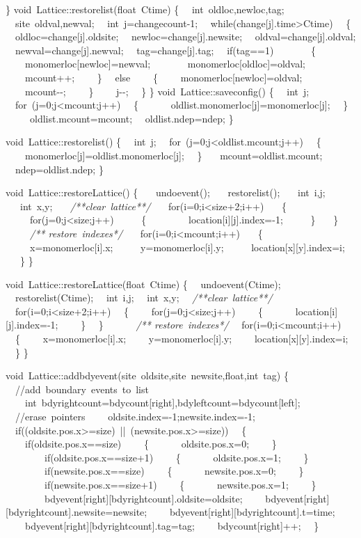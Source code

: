 {\}
void\ Lattice::restorelist(float\ Ctime)
\{
\ \ int\ oldloc,newloc,tag;
\ \ site\ oldval,newval;
\ \ int\ j=changecount-{}1;
\ \ while(change[j].time>{}Ctime)
\ \ \{
\ \ oldloc=change[j].oldsite;
\ \ newloc=change[j].newsite;
\ \ oldval=change[j].oldval;
\ \ newval=change[j].newval;
\ \ tag=change[j].tag;
\ \ if(tag==1)
\ \ \ \ \ \ \ \{
\ \ \ \ monomerloc[newloc]=newval;
\ \ \ \ \ \ \ monomerloc[oldloc]=oldval;
\ \ \ \ mcount++;
\ \ \ \ \}
\ \ else
\ \ \ \ \{
\ \ \ \ monomerloc[newloc]=oldval;
\ \ \ \ mcount-{}-{};
\ \ \ \ \}
\ \ \ \ j-{}-{};
\ \ \}
\}
void\ Lattice::saveconfig()
\{
\ \ int\ j;
\ \ for\ (j=0;j<{}mcount;j++)
\ \ \{
\ \ \ \ \ \ oldlist.monomerloc[j]=monomerloc[j];
\ \ \}
\ \ \
\ \ oldlist.mcount=mcount;
\ \ oldlist.ndep=ndep;
\}

void\ Lattice::restorelist()
\{
\ \ int\ j;
\ \ for\ (j=0;j<{}oldlist.mcount;j++)
\ \ \{
\ \ \ \ monomerloc[j]=oldlist.monomerloc[j];
\ \ \}
\
\ \ mcount=oldlist.mcount;
\ \ ndep=oldlist.ndep;
\}

void\ Lattice::restoreLattice()
\{
\ \ \ undoevent();
\ \ \ restorelist();
\ \ \ int\ i,j;
\ \ \ int\ x,y;
\ \ \ \textsl{/**clear\ lattice**/}
\ \ \ for(i=0;i<{}size+2;i++)
\ \ \ \{
\ \ \ \ \ for(j=0;j<{}size;j++)
\ \ \ \ \ \{
\ \ \ \ \ \ \ \ location[i][j].index=-{}1;
\ \ \ \ \ \}
\ \ \ \}
\ \
\ \ \ \textsl{/** restore\ indexes*/}
\ \ \ for(i=0;i<{}mcount;i++)
\ \ \ \{
\ \ \ \ \ x=monomerloc[i].x;
\ \ \ \ \ y=monomerloc[i].y;
\ \ \ \ \ location[x][y].index=i;
\ \ \ \}
\}

void\ Lattice::restoreLattice(float\ Ctime)
\{
\ \ undoevent(Ctime);
\ \ restorelist(Ctime);
\ \ int\ i,j;
\ \ int\ x,y;
\ \ \textsl{/**clear\ lattice**/}
\ \ for(i=0;i<{}size+2;i++)
\ \ \{
\ \ \ \ for(j=0;j<{}size;j++)
\ \ \ \ \{
\ \ \ \ \ \ location[i][j].index=-{}1;
\ \ \ \ \}
\ \ \}
\ \ \ \
\ \ \textsl{/** restore\ indexes*/}
\ \ for(i=0;i<{}mcount;i++)
\ \ \{
\ \ \ \ x=monomerloc[i].x;
\ \ \ \ y=monomerloc[i].y;
\ \ \ \ location[x][y].index=i;
\ \ \}
\}

void\ Lattice::addbdyevent(site\ oldsite,site\ newsite,float,int\ tag)
\{
\ \ //add\ boundary\ events\ to\ list
\ \ \ \ int\ bdyrightcount=bdycount[right],bdyleftcount=bdycount[left];
\ \ //erase\ pointers
\ \ \ \ oldsite.index=-{}1;newsite.index=-{}1;
\ \ if((oldsite.pos.x>{}=size)\ ||\ (newsite.pos.x>{}=size))
\ \ \{
\ \ \ \ if(oldsite.pos.x==size)
\ \ \ \ \{
\ \ \ \ \ \ oldsite.pos.x=0;
\ \ \ \ \}
\ \ \ \
\ \ \ \ if(oldsite.pos.x==size+1)
\ \ \ \ \{
\ \ \ \ \ \ oldsite.pos.x=1;
\ \ \ \ \}
\ \ \ \
\ \ \ \ if(newsite.pos.x==size)
\ \ \ \ \{
\ \ \ \ \ \ newsite.pos.x=0;
\ \ \ \ \}
\ \ \ \
\ \ \ \ if(newsite.pos.x==size+1)
\ \ \ \ \{
\ \ \ \ \ \ newsite.pos.x=1;
\ \ \ \ \}
\ \ \ \
\ \ \ \ bdyevent[right][bdyrightcount].oldsite=oldsite;
\ \ \ \ bdyevent[right][bdyrightcount].newsite=newsite;
\ \ \ \ bdyevent[right][bdyrightcount].t=time;
\ \ \ \ bdyevent[right][bdyrightcount].tag=tag;
\ \ \ \ bdycount[right]++;
\ \ \}

}
